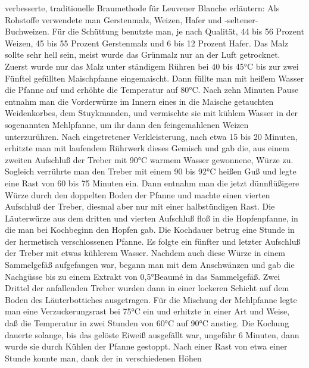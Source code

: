 \documentclass[a4paper,parskip=half]{scrartcl}
\begin{document}
\parencite[10]{Strottner1999}

verbesserte, traditionelle Braumethode für Leuvener Blanche erläutern:
Als Rohstoffe verwendete man Gerstenmalz, Weizen, Hafer und -seltener-
Buchweizen. Für die Schüttung benutzte man, je nach Qualität, 44 bis 56 Prozent
Weizen, 45 bis 55 Prozent Gerstenmalz und 6 bis 12 Prozent Hafer. Das Malz sollte
sehr hell sein, meist wurde das Grünmalz nur an der Luft getrocknet.
Zuerst wurde nur das Malz unter ständigem Rühren bei 40 bis 45°C bis zur zwei
Fünftel gefüllten Maischpfanne eingemaischt. Dann füllte man mit heißem Wasser
die Pfanne auf und erhöhte die Temperatur auf 80°C. Nach zehn Minuten Pause
entnahm man die Vorderwürze im Innern eines in die Maische getauchten
Weidenkorbes, dem Stuykmanden, und vermischte sie mit kühlem Wasser in der
sogenannten Mehlpfanne, um ihr dann den feingemahlenen Weizen unterzurühren.
Nach eingetretener Verkleisterung, nach etwa 15 bis 20 Minuten, erhitzte man mit
laufendem Rührwerk dieses Gemisch und gab die, aus einem zweiten Aufschluß der
Treber mit 90°C warmem Wasser gewonnene, Würze zu. Sogleich verrührte man
den Treber mit einem 90 bis 92°C heißen Guß und legte eine Rast von 60 bis
75 Minuten ein. Dann entnahm man die jetzt dünnflüßigere Würze durch den
doppelten Boden der Pfanne und machte einen vierten Aufschluß der Treber,
diesmal aber nur mit einer halbstündigen Rast. Die Läuterwürze aus dem dritten und
vierten Aufschluß floß in die Hopfenpfanne, in die man bei Kochbeginn den Hopfen
gab. Die Kochdauer betrug eine Stunde in der hermetisch verschlossenen Pfanne.
Es folgte ein fünfter und letzter Aufschluß der Treber mit etwas kühlerem Wasser.
Nachdem auch diese Würze in einem Sammelgefäß aufgefangen war, begann man
mit dem Anschwänzen und gab die Nachgüsse bis zu einem Extrakt von
0,5°Beaumé in das Sammelgefäß.
Zwei Drittel der anfallenden Treber wurden dann in einer lockeren Schicht auf dem
Boden des Läuterbottiches ausgetragen.
Für die Mischung der Mehlpfanne legte man eine Verzuckerungsrast bei 75°C ein
und erhitzte in einer Art und Weise, daß die Temperatur in zwei Stunden von 60°C
auf 90°C anstieg. Die Kochung dauerte solange, bis das gelöste Eiweiß ausgefällt
war, ungefähr 6 Minuten, dann wurde sie durch Kühlen der Pfanne gestoppt. Nach
einer Rast von etwa einer Stunde konnte man, dank der in verschiedenen Höhen

\parencite[11]{Strottner1999}
\end{document}
